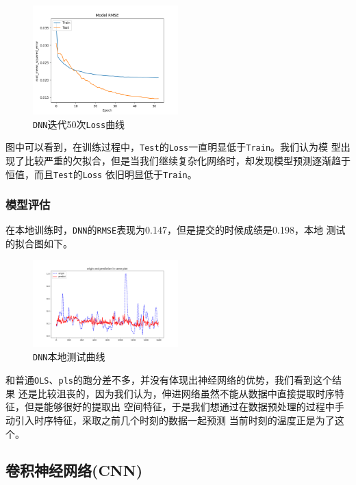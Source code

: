 \documentclass[11pt,a4paper]{elegantpaper}
\begin{document}
\begin{multicols}{2}
\begin{figure}[H]
  \centering
  \includegraphics[width=0.5\textwidth]{images/RMSE_NN_1.png}
  \caption{\lstinline{DNN}迭代50次\lstinline{Loss}曲线} 
\end{figure}

图中可以看到，在训练过程中，\lstinline{Test}的\lstinline{Loss}一直明显低于\lstinline{Train}。我们认为模
型出现了比较严重的欠拟合，但是当我们继续复杂化网络时，却发现模型预测逐渐趋于恒值，而且\lstinline{Test}的\lstinline{Loss}
依旧明显低于\lstinline{Train}。

\subsubsection{模型评估}

在本地训练时，\lstinline{DNN}的\lstinline{RMSE}表现为0.147，但是提交的时候成绩是0.198，本地
测试的拟合图如下。

\begin{figure}[H]
  \centering
  \includegraphics[width=0.5\textwidth]{images/NN_PRED.png}
  \caption{\lstinline{DNN}本地测试曲线} 
\end{figure}

和普通\lstinline{OLS}、\lstinline{pls}的跑分差不多，并没有体现出神经网络的优势，我们看到这个结果
还是比较沮丧的，因为我们认为，伸进网络虽然不能从数据中直接提取时序特征，但是能够很好的提取出
空间特征，于是我们想通过在数据预处理的过程中手动引入时序特征，采取之前几个时刻的数据一起预测
当前时刻的温度正是为了这个。

\subsection{卷积神经网络(CNN)}


\end{multicols}
\end{document}
